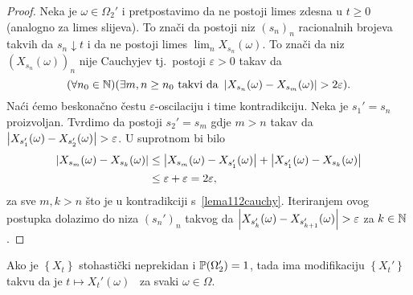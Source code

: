 \documentclass[main.tex]{subfiles}
\begin{document}
\begin{proof}
	Neka je \( \omega \in \Omega_2' \) i pretpostavimo da ne postoji limes zdesna u \( t \ge 0 \) (analogno za limes slijeva). To znači da postoji niz \( (s_n)_n \)
	racionalnih brojeva takvih da \( s_n \downarrow t \) i da ne postoji limes \( \lim_n X_{s_n}(\omega) \). To znači da niz \( (X_{s_n}(\omega))_n \) nije Cauchyjev tj.\ postoji
	\( \varepsilon > 0 \) takav da
	\begin{equation} \label{lema112cauchy}
		(\forall n_0 \in \N)(\exists m,n \ge n_0 \mathrm{\ takvi \ da \ } \abs{X_{s_n}(\omega) - X_{s_m}(\omega)} > 2\varepsilon ).
	\end{equation}
	Naći ćemo beskonačno čestu \( \varepsilon \)-oscilaciju i time kontradikciju. Neka je \( s_1' = s_n \) proizvoljan. Tvrdimo da postoji
	\( s_2' = s_m \) gdje \( m > n \) takav da \( \abs{X_{s_1'}(\omega) - X_{s_2'}(\omega)} > \varepsilon \). U suprotnom bi bilo
	\begin{equation}
		\begin{aligned}
			\abs{X_{s_m}(\omega) - X_{s_k}(\omega)} & \le \abs{X_{s_m}(\omega) - X_{s_1'}(\omega)} + \abs{X_{s_1'}(\omega) - X_{s_k}(\omega)} \\
			                                        & \le \varepsilon + \varepsilon = 2\varepsilon,
		\end{aligned}
	\end{equation}
	za sve \( m, k > n \) što je u kontradikciji s~\eqref{lema112cauchy}. Iteriranjem ovog postupka dolazimo do
	niza \( (s_n')_n \) takvog da \( \abs{X_{s_k'}(\omega) - X_{s_{k+1}'}(\omega)} > \varepsilon \) za \( k \in \N \).
\end{proof}

\begin{lema}
	Ako je \( \left\{ X_t \right\} \) stohastički neprekidan i \( \P(\Omega_2') = 1 \), tada ima modifikaciju \( \left\{ X_t' \right\} \)
	takvu da je \( t \mapsto X_t'(\omega) \) \cadlag \ za svaki \( \omega \in \Omega \).
\end{lema}
\end{document}
